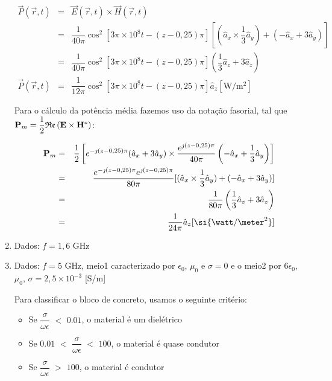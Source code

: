 \begin{enumerate}[1.]
\begin{eqnarray*}
  \vec{P}(\vec{r},t) & = & \vec{E}(\vec{r},t) \times \vec{H}(\vec{r},t) \nonumber \\
  & = & \dfrac{1}{40\pi}\cos^{2}[3\pi \times 10^{8}t - (z - 0,25)\pi][(\hat{a}_{x} \times \dfrac{1}{3} \hat{a}_{y}) + (-\hat{a}_{x} + 3\hat{a}_{y})] \nonumber \\
  & = & \dfrac{1}{40\pi}\cos^{2}[3\pi \times 10^{8}t - (z - 0,25)\pi](\dfrac{1}{3}\hat{a}_{z} + 3\hat{a}_{z}) \nonumber \\
  \vec{P}(\vec{r},t) & = &  \dfrac{1}{12\pi}\cos^{2}[3\pi \times 10^{8}t - (z - 0,25)\pi] \hat{a}_{z} [\si{\watt/\meter^{2}}] \nonumber
\end{eqnarray*}

Para o cálculo da potência média fazemos uso da notação fasorial, tal que ${\bf P}_{m} = \dfrac{1}{2}\mathfrak{Re}\left({\bf E} \times {\bf H}^{*} \right)$:

\begin{eqnarray*}  
  {\bf P}_{m} & = & \dfrac{1}{2}\left[e^{-\jmath (z - 0,25)\pi}(\hat{a}_{x} + 3\hat{a}_{y}) \times \dfrac{e^{\jmath (z - 0,25)\pi}}{40\pi}\left(-\hat{a}_{x} + \dfrac{1}{3}\hat{a}_{y}\right)\right] \nonumber \\
  & = & \dfrac{e^{-\jmath (z - 0,25)\pi} e^{\jmath (z - 0,25)\pi}}{80\pi} [(\hat{a}_{x} \times \dfrac{1}{3} \hat{a}_{y}) + \left(-\hat{a}_{x} + 3\hat{a}_{y}\right)] \nonumber \\
  & = & \dfrac{1}{80\pi}\left(\dfrac{1}{3}\hat{a}_{z} + 3\hat{a}_{z}\right) \nonumber \\
  & = & \dfrac{1}{24\pi} \hat{a}_{z}[\si{\watt/\meter^{2}}] \nonumber
\end{eqnarray*}

\item Dados: $f = 1,6$ \si{\giga\hertz}

\newpage

\item Dados: $f = 5$ \si{\giga\hertz}, meio1 caracterizado por $\epsilon_{0}$, $\mu_{0}$ e $\sigma = 0$ e o meio2 por $6 \epsilon_{0}$, $\mu_{0}$, $\sigma = 2,5 \times 10^{-3}$ [\si{\siemens/\meter}]

Para classificar o bloco de concreto, usamos o seguinte critério:
\begin{itemize}
  {\setlength\itemindent{25pt}}\item Se $\dfrac{\sigma}{\omega \epsilon}$ $<$ $0.01$, o material é um dielétrico
  {\setlength\itemindent{25pt}}\item Se $0.01$ $<$ $\dfrac{\sigma}{\omega \epsilon}$ $<$ $100$, o material é quase condutor
  {\setlength\itemindent{25pt}}\item Se $\dfrac{\sigma}{\omega \epsilon}$ $>$ $100$, o material é condutor
\end{itemize}


\end{enumerate}
